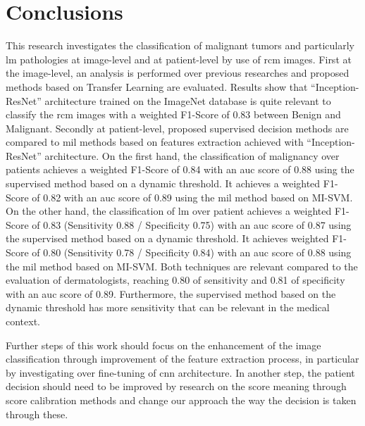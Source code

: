 \documentclass[journal,article,submit,moreauthors,pdftex, applsci]{Definitions/mdpi}
\begin{document}
\section{Conclusions}
\label{sec:conclusions}
This research investigates the classification of malignant tumors and particularly \ac{lm} pathologies at image-level and at patient-level by use of \ac{rcm} images. First at the image-level, an analysis is performed over previous researches and proposed methods based on Transfer Learning are evaluated. Results show that “Inception-ResNet” architecture trained on the ImageNet database is quite relevant to classify the \ac{rcm} images with a weighted F1-Score of 0.83 between Benign and Malignant. Secondly at patient-level, proposed supervised decision methods are compared to \ac{mil} methods based on features extraction achieved with “Inception-ResNet” architecture. On the first hand, the classification of malignancy over patients achieves a weighted F1-Score of 0.84 with an \ac{auc} score of 0.88 using the supervised method based on a dynamic threshold. It achieves a weighted F1-Score of 0.82 with an \ac{auc} score of 0.89 using the \ac{mil} method based on MI-SVM. On the other hand, the classification of \ac{lm} over patient achieves a weighted F1-Score of 0.83 (Sensitivity 0.88 / Specificity 0.75) with an \ac{auc} score of 0.87 using the supervised method based on a dynamic threshold. It achieves weighted F1-Score of 0.80 (Sensitivity 0.78 / Specificity 0.84) with an \ac{auc} score of 0.88 using the \ac{mil} method based on MI-SVM. Both techniques are relevant compared to the evaluation of dermatologists, reaching 0.80 of sensitivity and 0.81 of specificity with an \ac{auc} score of 0.89. Furthermore, the supervised method based on the dynamic threshold has more sensitivity that can be relevant in the medical context.\par
Further steps of this work should focus on the enhancement of the image classification through improvement of the feature extraction process, in particular by investigating over fine-tuning of \ac{cnn} architecture. In another step, the patient decision should need to be improved by research on the score meaning through score calibration methods and change our approach the way the decision is taken through these.\par

\newpage

\end{document}
